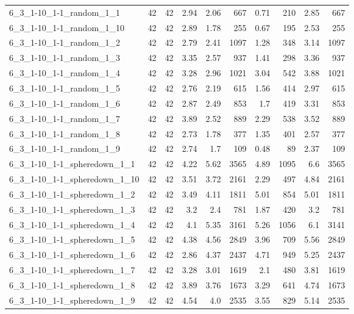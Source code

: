 \begin{center}
\begin{scriptsize}
\begin{longtable}{lrrrrrrrrr}
6\_3\_1-10\_1-1\_random\_1\_1 & 42 & 42 & 2.94 & 2.06 & 667 & 0.71 & 210 & 2.85 & 667\\
6\_3\_1-10\_1-1\_random\_1\_10 & 42 & 42 & 2.89 & 1.78 & 255 & 0.67 & 195 & 2.53 & 255\\
6\_3\_1-10\_1-1\_random\_1\_2 & 42 & 42 & 2.79 & 2.41 & 1097 & 1.28 & 348 & 3.14 & 1097\\
6\_3\_1-10\_1-1\_random\_1\_3 & 42 & 42 & 3.35 & 2.57 & 937 & 1.41 & 298 & 3.36 & 937\\
6\_3\_1-10\_1-1\_random\_1\_4 & 42 & 42 & 3.28 & 2.96 & 1021 & 3.04 & 542 & 3.88 & 1021\\
6\_3\_1-10\_1-1\_random\_1\_5 & 42 & 42 & 2.76 & 2.19 & 615 & 1.56 & 414 & 2.97 & 615\\
6\_3\_1-10\_1-1\_random\_1\_6 & 42 & 42 & 2.87 & 2.49 & 853 & 1.7 & 419 & 3.31 & 853\\
6\_3\_1-10\_1-1\_random\_1\_7 & 42 & 42 & 3.89 & 2.52 & 889 & 2.29 & 538 & 3.52 & 889\\
6\_3\_1-10\_1-1\_random\_1\_8 & 42 & 42 & 2.73 & 1.78 & 377 & 1.35 & 401 & 2.57 & 377\\
6\_3\_1-10\_1-1\_random\_1\_9 & 42 & 42 & 2.74 & 1.7 & 109 & 0.48 & 89 & 2.37 & 109\\
6\_3\_1-10\_1-1\_spheredown\_1\_1 & 42 & 42 & 4.22 & 5.62 & 3565 & 4.89 & 1095 & 6.6 & 3565\\
6\_3\_1-10\_1-1\_spheredown\_1\_10 & 42 & 42 & 3.51 & 3.72 & 2161 & 2.29 & 497 & 4.84 & 2161\\
6\_3\_1-10\_1-1\_spheredown\_1\_2 & 42 & 42 & 3.49 & 4.11 & 1811 & 5.01 & 854 & 5.01 & 1811\\
6\_3\_1-10\_1-1\_spheredown\_1\_3 & 42 & 42 & 3.2 & 2.4 & 781 & 1.87 & 420 & 3.2 & 781\\
6\_3\_1-10\_1-1\_spheredown\_1\_4 & 42 & 42 & 4.1 & 5.35 & 3161 & 5.26 & 1056 & 6.1 & 3141\\
6\_3\_1-10\_1-1\_spheredown\_1\_5 & 42 & 42 & 4.38 & 4.56 & 2849 & 3.96 & 709 & 5.56 & 2849\\
6\_3\_1-10\_1-1\_spheredown\_1\_6 & 42 & 42 & 2.86 & 4.37 & 2437 & 4.71 & 949 & 5.25 & 2437\\
6\_3\_1-10\_1-1\_spheredown\_1\_7 & 42 & 42 & 3.28 & 3.01 & 1619 & 2.1 & 480 & 3.81 & 1619\\
6\_3\_1-10\_1-1\_spheredown\_1\_8 & 42 & 42 & 3.89 & 3.76 & 1673 & 3.29 & 641 & 4.74 & 1673\\
6\_3\_1-10\_1-1\_spheredown\_1\_9 & 42 & 42 & 4.54 & 4.0 & 2535 & 3.55 & 829 & 5.14 & 2535\\

\end{longtable}
\end{scriptsize}
\end{center}
